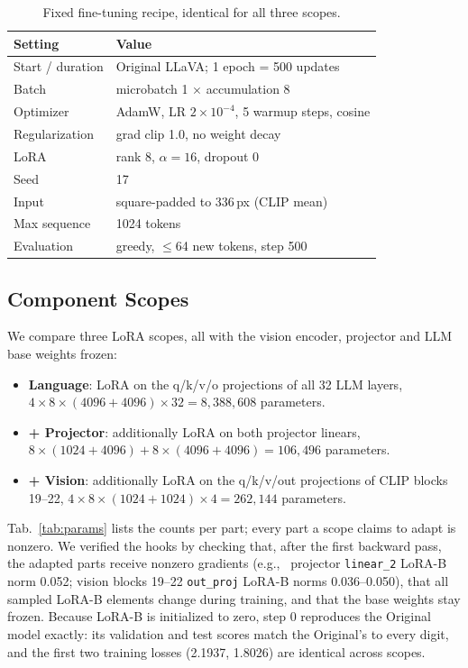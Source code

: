 \documentclass[10pt,twocolumn,letterpaper]{article}
\begin{document}
\begin{table}[t]
  \centering
  \small
  \begin{tabular}{@{}p{}p{}@{}}
    \toprule
    Setting & Value \\
    \midrule
    Start / duration & Original LLaVA; 1 epoch = 500 updates \\
    Batch            & microbatch 1 $\times$ accumulation 8 \\
    Optimizer        & AdamW, LR $2\times10^{-4}$, 5 warmup steps, cosine \\
    Regularization   & grad clip 1.0, no weight decay \\
    LoRA             & rank 8, $\alpha=16$, dropout 0~\cite{hu2022lora} \\
    Seed             & 17 \\
    Input            & square-padded to 336\,px (CLIP mean) \\
    Max sequence     & 1024 tokens \\
    Evaluation       & greedy, $\le$64 new tokens, step 500 \\
    \bottomrule
  \end{tabular}
  \caption{Fixed fine-tuning recipe, identical for all three scopes.}
  \label{tab:recipe}
\end{table}

\subsection{Component Scopes}

We compare three LoRA scopes, all with the vision encoder, projector and LLM base weights frozen:
\begin{itemize}
  \item \textbf{Language}: LoRA on the q/k/v/o projections of all 32 LLM layers, $4 \times 8 \times (4096+4096) \times 32 = 8{,}388{,}608$ parameters.
  \item \textbf{+ Projector}: additionally LoRA on both projector linears, $8 \times (1024+4096) + 8 \times (4096+4096) = 106{,}496$ parameters.
  \item \textbf{+ Vision}: additionally LoRA on the q/k/v/out projections of CLIP blocks 19--22, $4 \times 8 \times (1024+1024) \times 4 = 262{,}144$ parameters.
\end{itemize}
Tab.~\ref{tab:params} lists the counts per part; every part a scope claims to adapt is nonzero. We verified the hooks by checking that, after the first backward pass, the adapted parts receive nonzero gradients (e.g., \ projector \texttt{linear\_2} LoRA-B norm 0.052; vision blocks 19--22 \texttt{out\_proj} LoRA-B norms 0.036--0.050), that all sampled LoRA-B elements change during training, and that the base weights stay frozen. Because LoRA-B is initialized to zero, step 0 reproduces the Original model exactly: its validation and test scores match the Original's to every digit, and the first two training losses (2.1937, 1.8026) are identical across scopes.
\end{document}
